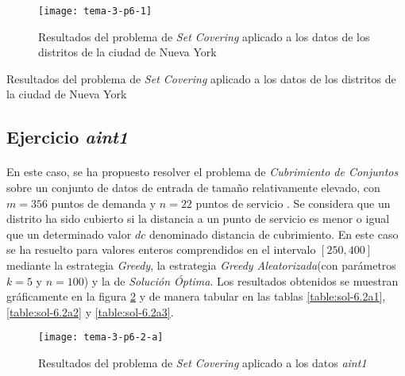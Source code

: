 \documentclass[spanish]{article}
\begin{document}
			\begin{figure}[h]
				\begin{center}
					\texttt{[image: tema-3-p6-1]}
				\end{center}
				\caption{Resultados del problema de \emph{Set Covering} aplicado a los datos de los distritos de la ciudad de Nueva York}
				\label{fig:sol-6.1}
			\end{figure}


			\begin{table}[h]
				\begin{center}
				\end{center}
				\caption{Resultados del problema de \emph{Set Covering} aplicado a los datos de los distritos de la ciudad de Nueva York}
				\label{table:sol-6.1}
			\end{table}

		\subsection{Ejercicio \emph{aint1}}
		\label{sec:e-6.2a}

			\paragraph{}
			En este caso, se ha propuesto resolver el problema de \emph{Cubrimiento de Conjuntos} sobre un conjunto de datos de entrada de tamaño relativamente elevado, con $m = 356$ puntos de demanda y $n=22$ puntos de servicio . Se considera que un distrito ha sido cubierto si la distancia a un punto de servicio es menor o igual que un determinado valor $dc$ denominado distancia de cubrimiento. En este caso se ha resuelto para valores enteros comprendidos en el intervalo $[250, 400]$ mediante la estrategia \emph{Greedy}, la estrategia \emph{Greedy Aleatorizada}(con parámetros $k=5$ y $n=100$)  y la de \emph{Solución Óptima}. Los resultados obtenidos se muestran gráficamente en la figura \ref{fig:sol-6.2a} y de manera tabular en las tablas \ref{table:sol-6.2a1}, \ref{table:sol-6.2a2} y \ref{table:sol-6.2a3}.

			\begin{figure}[h]
				\begin{center}
					\texttt{[image: tema-3-p6-2-a]}
				\end{center}
				\caption{Resultados del problema de \emph{Set Covering} aplicado a los datos \emph{aint1}}
				\label{fig:sol-6.2a}
			\end{figure}
\end{document}
